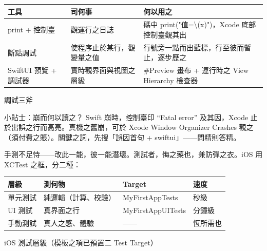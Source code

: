 


\begin{center}
\begin{tabularx}{\linewidth}{|X|X|X|}
\hline
\textbf{工具} & \textbf{司何事} & \textbf{何以用之} \tabularnewline
\hline
print + 控制臺 & 觀運行之日誌 & 碼中 print("值=\textbackslash{}(x)")，Xcode 底部控制臺觀其出 \tabularnewline
斷點調試 & 使程序止於某行，觀變量之值 & 行號旁一點而出藍標，行至彼而暫止，逐步歷之 \tabularnewline
SwiftUI 預覽 + 調試器 & 實時觀界面與視圖之層級 & \#Preview 畫布 + 運行時之 View Hierarchy 檢查器 \tabularnewline
\hline
\end{tabularx}
\end{center}

\begin{center}\small\color{gray}調試三斧\end{center}

\begin{tcbinfo}{小貼士：崩而何以讀之？}
Swift 崩時，控制臺印 “Fatal error” 及其因，Xcode 止於出誤之行而高亮。真機之舊崩，可於 Xcode Window Organizer Crashes 觀之（須付費之賬）。關鍵之詞，先搜「誤因首句 + swiftui」——問精則答精。

\end{tcbinfo}


手測不足恃——改此一能，彼一能潛壞。測試者，悔之藥也，兼防彈之衣。iOS 用 XCTest 之框，分二種：

\begin{center}
\begin{tabularx}{\linewidth}{|X|X|X|X|}
\hline
\textbf{層級} & \textbf{測何物} & \textbf{Target} & \textbf{速度} \tabularnewline
\hline
單元測試 & 純邏輯（計算、校驗） & MyFirstAppTests & 秒級 \tabularnewline
UI 測試 & 真界面之行 & MyFirstAppUITests & 分鐘級 \tabularnewline
手動測試 & 真人之感、體驗 & —— & 恆所需也 \tabularnewline
\hline
\end{tabularx}
\end{center}

\begin{center}\small\color{gray}iOS 測試層級（模板之項已預置二 Test Target）\end{center}


